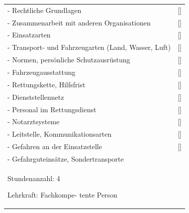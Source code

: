 \begin{xtabular}{p{10cm}p{5cm}}
- Rechtliche Grundlagen  
& 
\ref{}\noindent{}
\\
- Zusammenarbeit mit  anderen Organisationen
& 
\ref{}\noindent{}
\\
- Einsatzarten
& 
\ref{}\noindent{}
\\
- Transport- und Fahrzeugarten (Land,  Wasser, Luft)
& 
\ref{}\noindent{}
\\
- Normen, persönliche Schutzausrüstung
& 
\ref{}\noindent{}
\\
- Fahrzeugausstattung
& 
\ref{}\noindent{}
\\
- Rettungskette, Hilfsfrist
& 
\ref{}\noindent{}
\\
- Dienststellennetz
& 
\ref{}\noindent{}
\\
- Personal im Rettungsdienst
& 
\ref{}\noindent{}
\\
- Notarztsysteme
& 
\ref{}\noindent{}
\\
- Leitstelle, Kommunikationsarten
& 
\ref{}\noindent{}
\\
- Gefahren an der Einsatzstelle
& 
\ref{}\noindent{}
\\
- Gefahrguteinsätze, Sondertransporte

 \\\toprule
{}  



\begin{inparadesc}
\item[Stundenanzahl:]  4  
\item[Lehrkraft:]  Fachkompe- tente Person
\end{inparadesc}

\\\midrule


\end{xtabular}
